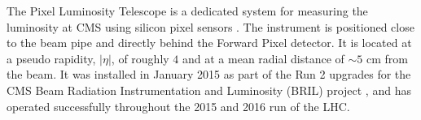 The Pixel Luminosity Telescope is a dedicated system for measuring the luminosity at
CMS using silicon pixel sensors \cite{Kornmayer2015}. The instrument is positioned close to the beam pipe and directly behind the Forward Pixel detector. It is located at a pseudo rapidity, $|\eta|$, of roughly $4$ and at a mean radial distance of $\sim 5$ cm from the beam.
 It was installed in January 2015 as part of the Run 2 upgrades for the CMS Beam Radiation Instrumentation and Luminosity (BRIL) project \cite{Dabrowski:1966978}, and has operated successfully throughout the 2015 and 2016 run of the LHC.



